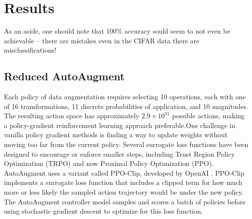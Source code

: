 \documentclass[10pt,twocolumn,letterpaper]{article}
\begin{document}
\section{Results}





As an aside, one should note that 100\% accuracy sould seem to not even be achievable -- there are mistakes even in the CIFAR data there are misclassifications!  %

% 
% 
% 

\subsection{Reduced AutoAugment}
Each policy of data augmentation requires selecting 10 operations, each with one of 16 transformations, 11 discrete probabilities of application, and 10 magnitudes.  The resulting action space has approximately $2.9 \times 10^{31}$ possible actions, making a policy-gradient reinforcement learning approach preferable.One challenge in vanilla policy gradient methods is finding a way to update weights without moving too far from the current policy. Several surrogate loss functions have been designed to encourage or enforce smaller steps, including Trust Region Policy Optimization (TRPO) and now Proximal Policy Optimization (PPO). AutoAugment uses a variant called PPO-Clip, developed by OpenAI \cite{Schulman2017}. PPO-Clip implements a surrogate loss function that includes a clipped term for how much more or less likely the sampled action trajectory would be under the new policy. The AutoAugment controller model samples and scores a batch of policies before using stochastic gradient descent to optimize for this loss function.
\end{document}
